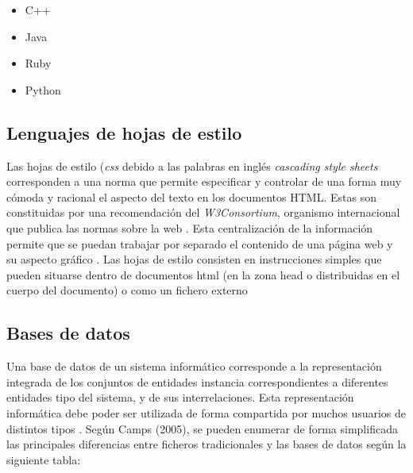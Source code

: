 \begin{itemize}
\item C++
\item Java
\item Ruby
\item Python
\end{itemize}

\subsection{Lenguajes de hojas de estilo}


Las hojas de estilo (\textit{css} debido a las palabras en inglés \textit{cascading style sheets} corresponden a una norma que permite especificar y controlar de una forma muy cómoda y racional el aspecto del texto en los documentos HTML. Estas son constituidas por una recomendación del \textit{W3Consortium}, organismo internacional que publica las normas sobre la web \citep{codina2012}. Esta centralización de la información permite que se puedan trabajar por separado el contenido de una página web y su aspecto gráfico \citep{spip2012}. Las hojas de estilo consisten en instrucciones simples que pueden situarse dentro de documentos html (en la zona head o distribuidas en el cuerpo del documento) o como un fichero externo \citep{codina2012}


\subsection{Bases de datos}

Una base de datos de un sistema informático corresponde a la representación integrada de los conjuntos de entidades instancia correspondientes a diferentes entidades tipo del sistema, y de sus interrelaciones. Esta representación informática debe poder ser utilizada de forma compartida por muchos usuarios de distintos tipos \citep{camps2005}. Según Camps (2005), se pueden enumerar de forma simplificada las principales diferencias entre ficheros tradicionales y las bases de datos según la siguiente tabla:

